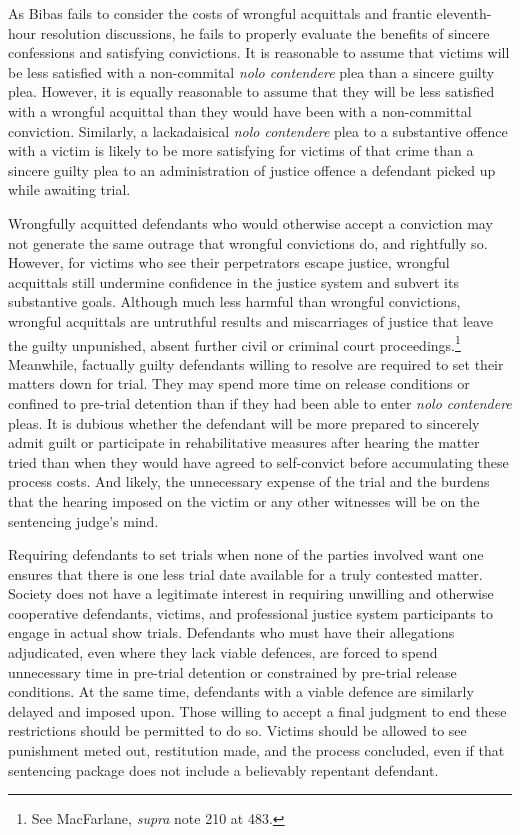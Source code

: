 As Bibas fails to consider the costs of wrongful acquittals and frantic eleventh-hour resolution discussions, he fails to properly evaluate the benefits of sincere confessions and satisfying convictions. It is reasonable to assume that victims will be less satisfied with a non-commital \textit{nolo contendere} plea than a sincere guilty plea. However, it is equally reasonable to assume that they will be less satisfied with a wrongful acquittal than they would have been with a non-committal conviction. Similarly, a lackadaisical \textit{nolo contendere} plea to a substantive offence with a victim is likely to be more satisfying for victims of that crime than a sincere guilty plea to an administration of justice offence a defendant picked up while awaiting trial.

Wrongfully acquitted defendants who would otherwise accept a conviction may not generate the same outrage that wrongful convictions do, and rightfully so. However, for victims who see their perpetrators escape justice, wrongful acquittals still undermine confidence in the justice system and subvert its substantive goals. Although much less harmful than wrongful convictions, wrongful acquittals are untruthful results and miscarriages of justice that leave the guilty unpunished, absent further civil or criminal court proceedings.\footnote{See MacFarlane, \textit{supra} note 210 at 483.} Meanwhile, factually guilty defendants willing to resolve are required to set their matters down for trial. They may spend more time on release conditions or confined to pre-trial detention than if they had been able to enter \textit{nolo contendere} pleas. It is dubious whether the defendant will be more prepared to sincerely admit guilt or participate in rehabilitative measures after hearing the matter tried than when they would have agreed to self-convict before accumulating these process costs. And likely, the unnecessary expense of the trial and the burdens that the hearing imposed on the victim or any other witnesses will be on the sentencing judge's mind.

Requiring defendants to set trials when none of the parties involved want one ensures that there is one less trial date available for a truly contested matter. Society does not have a legitimate interest in requiring unwilling and otherwise cooperative defendants, victims, and professional justice system participants to engage in actual show trials. Defendants who must have their allegations adjudicated, even where they lack viable defences, are forced to spend unnecessary time in pre-trial detention or constrained by pre-trial release conditions. At the same time, defendants with a viable defence are similarly delayed and imposed upon. Those willing to accept a final judgment to end these restrictions should be permitted to do so. Victims should be allowed to see punishment meted out, restitution made, and the process concluded, even if that sentencing package does not include a believably repentant defendant. 